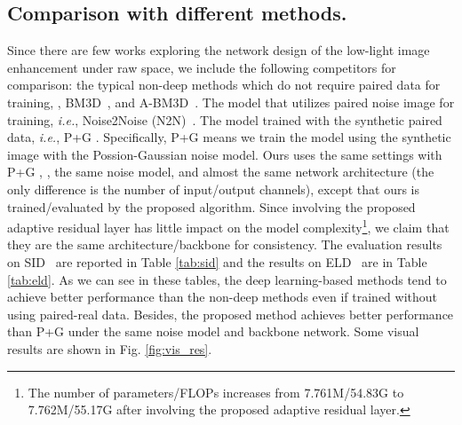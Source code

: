 \documentclass[10pt,twocolumn,letterpaper]{article}
\def\ie{\textit{i.e.}}
\begin{document}
\subsection{Comparison with different methods.} Since there are few works exploring the network design of the low-light image enhancement under raw space, we include the following competitors for comparison: the typical non-deep methods which do not require paired data for training, \eg, BM3D~\cite{dabov2007image}, and A-BM3D~\cite{makitalo2010optimal}. The model that utilizes paired noise image for training, \ie, Noise2Noise (N2N)~\cite{lehtinen2018noise2noise}. The model trained with the synthetic paired data, \ie, P+G \cite{foi2008practical, wei2020physics}. Specifically, P+G \cite{foi2008practical, wei2020physics} means we train the model using the synthetic image with the Possion-Gaussian noise model. Ours uses the same settings with P+G \cite{foi2008practical, wei2020physics}, \eg, the same noise model, and almost the same network architecture (the only difference is the number of input/output channels), except that ours is trained/evaluated by the proposed algorithm. Since involving the proposed adaptive residual layer has little impact on the model complexity\footnote{The number of parameters/FLOPs increases from 7.761M/54.83G to 7.762M/55.17G after involving the proposed adaptive residual layer.}, we claim that they are the same architecture/backbone for consistency.
The evaluation results on SID~\cite{chen2018learning} are reported in Table \ref{tab:sid} and the results on ELD~\cite{wei2020physics} are in Table \ref{tab:eld}. As we can see in these tables, the deep learning-based methods tend to achieve better performance than the non-deep methods even if trained without using paired-real data. Besides, the proposed method achieves better performance than P+G \cite{foi2008practical} under the same noise model and backbone network. Some visual results are shown in Fig. \ref{fig:vis_res}. 
\end{document}

